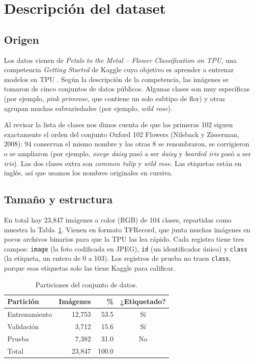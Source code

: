 \section{Descripción del dataset}
\subsection{Origen}
Los datos vienen de \textit{Petals to the Metal -- Flower Classification on TPU}, una competencia \textit{Getting Started} de Kaggle cuyo objetivo es aprender a entrenar modelos en TPU \parencite{kagglePetalsMetal}. Según la descripción de la competencia, las imágenes se tomaron de cinco conjuntos de datos públicos. Algunas clases son muy específicas (por ejemplo, \textit{pink primrose}, que contiene un solo subtipo de flor) y otras agrupan muchas subvariedades (por ejemplo, \textit{wild rose}).

Al revisar la lista de clases nos dimos cuenta de que las primeras 102 siguen exactamente el orden del conjunto Oxford 102 Flowers (Nilsback y Zisserman, 2008): 94 conservan el mismo nombre y las otras 8 se renombraron, se corrigieron o se ampliaron (por ejemplo, \textit{oxeye daisy} pasó a ser \textit{daisy} y \textit{bearded iris} pasó a ser \textit{iris}). Las dos clases extra son \textit{common tulip} y \textit{wild rose}. Las etiquetas están en inglés, así que usamos los nombres originales en cursiva.

\subsection{Tamaño y estructura}
En total hay 23,847 imágenes a color (RGB) de 104 clases, repartidas como muestra la Tabla~\ref{tab:particiones}. Vienen en formato TFRecord, que junta muchas imágenes en pocos archivos binarios para que la TPU las lea rápido. Cada registro tiene tres campos: \texttt{image} (la foto codificada en JPEG), \texttt{id} (un identificador único) y \texttt{class} (la etiqueta, un entero de 0 a 103). Los registros de prueba no traen \texttt{class}, porque esas etiquetas solo las tiene Kaggle para calificar.

\begin{table}[htbp]
\centering
\caption{Particiones del conjunto de datos.}
\label{tab:particiones}
\small
\begin{tabular}{lrrc}
\hline
Partición & Imágenes & \% & ¿Etiquetado? \\
\hline
Entrenamiento & 12,753 & 53.5 & Sí \\
Validación    &  3,712 & 15.6 & Sí \\
Prueba        &  7,382 & 31.0 & No \\
\hline
Total         & 23,847 & 100.0 & \\
\hline
\end{tabular}
\end{table}

